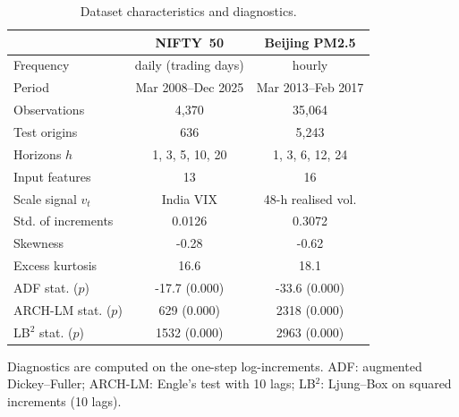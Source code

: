 \begin{table}[!t]\centering\caption{Dataset characteristics and diagnostics.}\label{tab:datasets}
\footnotesize\setlength{\tabcolsep}{4pt}\begin{tabular}{lcc}\toprule
 & NIFTY~50 & Beijing PM2.5 \\\midrule
Frequency & daily (trading days) & hourly \\
Period & Mar 2008--Dec 2025 & Mar 2013--Feb 2017 \\
Observations & 4,370 & 35,064 \\
Test origins & 636 & 5,243 \\
Horizons $h$ & 1, 3, 5, 10, 20 & 1, 3, 6, 12, 24 \\
Input features & 13 & 16 \\
Scale signal $v_t$ & India VIX & 48-h realised vol. \\
Std. of increments & 0.0126 & 0.3072 \\
Skewness & -0.28 & -0.62 \\
Excess kurtosis & 16.6 & 18.1 \\
ADF stat. ($p$) & -17.7 (0.000) & -33.6 (0.000) \\
ARCH-LM stat. ($p$) & 629 (0.000) & 2318 (0.000) \\
LB$^2$ stat. ($p$) & 1532 (0.000) & 2963 (0.000) \\
\bottomrule\end{tabular}
\par\smallskip\parbox{\linewidth}{\scriptsize Diagnostics are computed on the one-step log-increments. ADF: augmented Dickey--Fuller; ARCH-LM: Engle's test with 10 lags; LB$^2$: Ljung--Box on squared increments (10 lags).}
\end{table}